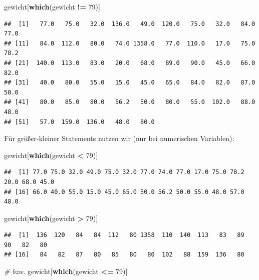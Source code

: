 \documentclass[
]{book}
\newenvironment{Shaded}{\begin{snugshade}}{\end{snugshade}}
\newcommand{\CommentTok}[1]{\textcolor[rgb]{0.56,0.35,0.01}{\textit{#1}}}
\newcommand{\DecValTok}[1]{\textcolor[rgb]{0.00,0.00,0.81}{#1}}
\newcommand{\FunctionTok}[1]{\textcolor[rgb]{0.13,0.29,0.53}{\textbf{#1}}}
\newcommand{\NormalTok}[1]{#1}
\newcommand{\SpecialCharTok}[1]{\textcolor[rgb]{0.81,0.36,0.00}{\textbf{#1}}}
\begin{document}
\begin{Shaded}
\begin{Highlighting}[]
\NormalTok{gewicht[}\FunctionTok{which}\NormalTok{(gewicht }\SpecialCharTok{!=} \DecValTok{79}\NormalTok{)]}
\end{Highlighting}
\end{Shaded}

\begin{verbatim}
##  [1]   77.0   75.0   32.0  136.0   49.0  120.0   75.0   32.0   84.0   77.0
## [11]   84.0  112.0   80.0   74.0 1358.0   77.0  110.0   17.0   75.0   78.2
## [21]  140.0  113.0   83.0   20.0   68.0   89.0   90.0   45.0   66.0   82.0
## [31]   40.0   80.0   55.0   15.0   45.0   65.0   84.0   82.0   87.0   50.0
## [41]   80.0   85.0   80.0   56.2   50.0   80.0   55.0  102.0   88.0   48.0
## [51]   57.0  159.0  136.0   48.0   80.0
\end{verbatim}

Für größer-kleiner Statements nutzen wir (nur bei numerischen Variablen):

\begin{Shaded}
\begin{Highlighting}[]
\NormalTok{gewicht[}\FunctionTok{which}\NormalTok{(gewicht }\SpecialCharTok{\textless{}} \DecValTok{79}\NormalTok{)]}
\end{Highlighting}
\end{Shaded}

\begin{verbatim}
##  [1] 77.0 75.0 32.0 49.0 75.0 32.0 77.0 74.0 77.0 17.0 75.0 78.2 20.0 68.0 45.0
## [16] 66.0 40.0 55.0 15.0 45.0 65.0 50.0 56.2 50.0 55.0 48.0 57.0 48.0
\end{verbatim}

\begin{Shaded}
\begin{Highlighting}[]
\NormalTok{gewicht[}\FunctionTok{which}\NormalTok{(gewicht }\SpecialCharTok{\textgreater{}} \DecValTok{79}\NormalTok{)]}
\end{Highlighting}
\end{Shaded}

\begin{verbatim}
##  [1]  136  120   84   84  112   80 1358  110  140  113   83   89   90   82   80
## [16]   84   82   87   80   85   80   80  102   88  159  136   80
\end{verbatim}

\begin{Shaded}
\begin{Highlighting}[]
\CommentTok{\# bzw.}
\NormalTok{gewicht[}\FunctionTok{which}\NormalTok{(gewicht }\SpecialCharTok{\textless{}=} \DecValTok{79}\NormalTok{)]}
\end{Highlighting}
\end{Shaded}
\end{document}
